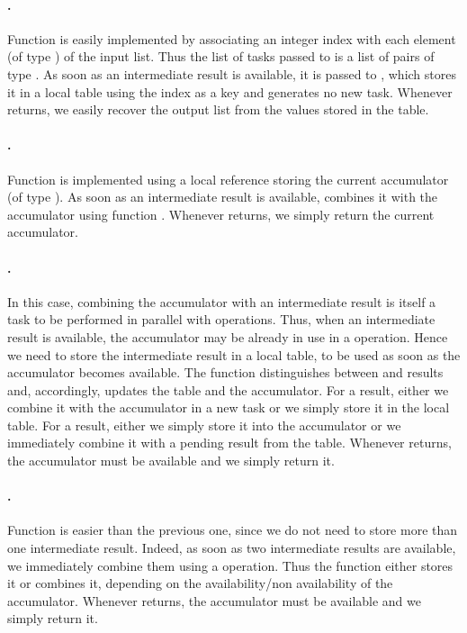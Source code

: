 \documentclass[preprint]{sigplanconf}
\begin{document}
\paragraph{.} 
Function  is easily implemented by associating an integer
index with each element (of type ) of the input list. Thus the
list of tasks passed to  is a list of pairs of type .
As soon as an intermediate result is available, it is passed to
, which stores it in a local table using the index as a key
and generates no new task. Whenever  returns, we easily
recover the output list from the values stored in the table.

\paragraph{.} 
Function  is implemented using a local reference
storing the current accumulator (of type ).
As soon as an intermediate result is available,  
combines it with the accumulator using function . Whenever 
returns, we simply return the current accumulator.

\paragraph{.}
In this case, combining the accumulator with an intermediate result is
itself a task to be performed in parallel with  operations.
Thus, when an intermediate  result is available, the
accumulator may be already in use in a  operation. Hence we
need to store the intermediate  result in a local table, to be
used as soon as the accumulator becomes available.
The  function distinguishes between  and 
results and, accordingly, updates the table and the accumulator. For a
 result, either we combine it with the accumulator in a new
task or we simply store it in the local table. For a  result,
either we simply store it into the accumulator or we immediately
combine it with a pending  result from the table.
Whenever  returns, the accumulator must be available and
we simply return it.

\paragraph{.}
Function  is easier than the previous one, since we do
not need to store more than one intermediate result. Indeed, as soon
as two intermediate results are available, we immediately combine them
using a  operation. Thus the  function 
either stores it or combines it, depending on the availability/non
availability of the accumulator.
Whenever  returns, the accumulator must be available and
we simply return it.
\end{document}
